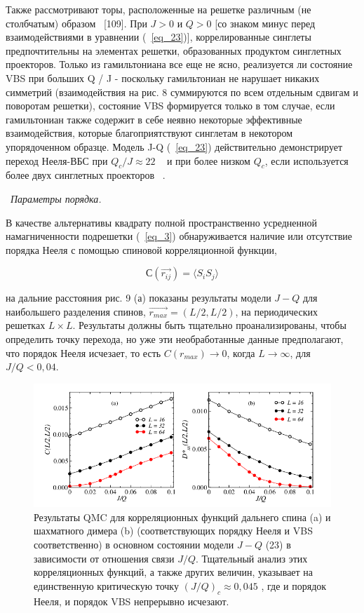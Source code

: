 \documentclass[11pt]{article}
\begin{document}
Также рассмотривают торы, расположенные на решетке различным (не столбчатым) образом ~\cite{prb_82_174428}[109]. При $J> 0$ и $Q> 0$ [со знаком минус перед взаимодействиями в уравнении (~\ref{eq_23})], коррелированные синглеты предпочтительны на элементах решетки, образованных продуктом синглетных проекторов. Только из гамильтониана все еще не ясно, реализуется ли состояние VBS при больших Q / J - поскольку гамильтониан не нарушает никаких симметрий (взаимодействия на рис. 8 суммируются по всем отдельным сдвигам и поворотам решетки), состояние VBS формируется только в том случае, если гамильтониан также содержит в себе неявно некоторые эффективные взаимодействия, которые благоприятствуют синглетам в некотором упорядоченном образце. Модель J-Q (~\ref{eq_23}) действительно демонстрирует переход Нееля-ВБС при $Q_c / J \approx 22$ ~\cite{prl_98_227202, prb_80_180414, prl_104_177201} и при более низком $Q_c$, если используется более двух синглетных проекторов ~\cite{prb_80_180414, prb_82_174428}.

~\emph{Параметры порядка. }

В качестве альтернативы квадрату полной пространственно усредненной намагниченности подрешетки (~\ref{eq_3}) обнаруживается наличие или отсутствие порядка Нееля с помощью спиновой корреляционной функции,

\begin{equation}
С(\vec{r_{ij}}) = \langle S_iS_j \rangle
\label{eq_24}
\end{equation}

на дальние расстояния рис. 9 (а) показаны результаты модели $J-Q$ для наибольшего разделения спинов, $\vec{r_{max}} = (L / 2, L / 2)$, на периодических решетках $L × L$. Результаты должны быть тщательно проанализированы, чтобы определить точку перехода, но уже эти необработанные данные предполагают, что порядок Нееля исчезает, то есть $C(r_{max}) → 0$, когда $L → ∞$, для $J / Q <0,04$.

\begin{figure}[htp]
\centering
\includegraphics[scale=0.5]{fig9}
\caption{Результаты QMC для корреляционных функций дальнего спина (a) и шахматного димера (b) (соответствующих порядку Нееля и VBS соответственно) в основном состоянии модели $J-Q$ (23) в зависимости от отношения связи $J / Q$. Тщательный анализ этих корреляционных функций, а также других величин, указывает на единственную критическую точку $(J / Q)_c \approx 0,045$ , где и порядок Нееля, и порядок VBS непрерывно исчезают.}
\label{}
\end{figure}
\end{document}
